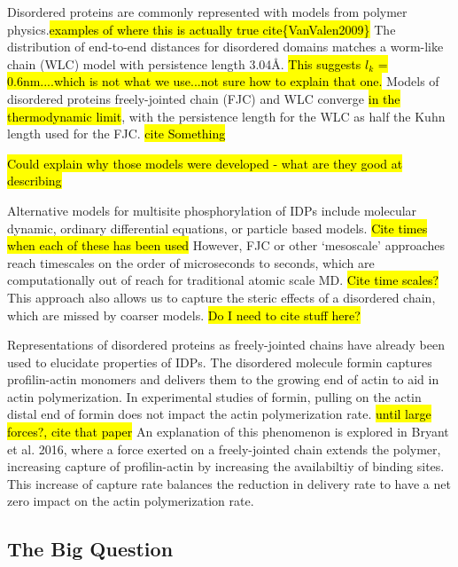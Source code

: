 \documentclass[../AdvancementSummary.tex]{subfiles}
\begin{document}
Disordered proteins are commonly represented with models from polymer physics.\hl{examples of where this is actually true cite\{VanValen2009\} } The distribution of end-to-end distances for disordered domains matches a worm-like chain (WLC) model with persistence length 3.04\AA . \hl{This suggests $l_k$ = 0.6nm....which is not what we use...not sure how to explain that one.} \cite{Zhou2001} Models of disordered proteins freely-jointed chain (FJC) and WLC converge \hl{in the thermodynamic limit}, with the persistence length for the WLC as half the Kuhn length used for the FJC. \hl{cite Something} 

\hl{Could explain why those models were developed - what are they good at describing}

Alternative models for multisite phosphorylation of IDPs include molecular dynamic, ordinary differential equations, or particle based models.  \hl{Cite times when each of these has been used} However, FJC or other `mesoscale' approaches reach timescales on the order of microseconds to seconds, which are computationally out of reach for traditional atomic scale MD. \hl{Cite time scales?} This approach also allows us to capture the steric effects of a disordered chain, which are missed by coarser models. \hl{Do I need to cite stuff here?}

Representations of disordered proteins as freely-jointed chains have already been used to elucidate properties of IDPs. The disordered molecule formin captures profilin-actin monomers and delivers them to the growing end of actin to aid in actin polymerization. In experimental studies of formin, pulling on the actin distal end of formin does not impact the actin polymerization rate. \hl{until large forces?, cite that paper} An explanation of this phenomenon is explored in Bryant et al. 2016, where a force exerted on a freely-jointed chain extends the polymer, increasing capture of profilin-actin by increasing the availabiltiy of binding sites. This increase of capture rate balances the reduction in delivery rate to have a net zero impact on the actin polymerization rate. 


\subsection{The Big Question}




\end{document}
